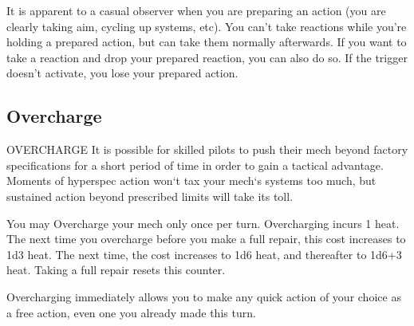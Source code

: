 It is apparent to a casual observer when you are preparing an action (you are clearly taking aim,  
cycling up systems, etc). You can’t take reactions while you’re holding a prepared action, but can  
take them normally afterwards. If you want to take a reaction and drop your prepared reaction,  
you can also do so. If the trigger doesn’t activate, you lose your prepared action.
 
\subsection{Overcharge}
                                            OVERCHARGE  
It is possible for skilled pilots to push their mech beyond factory specifications for a short period  
of time in order to gain a tactical advantage. Moments of hyperspec action won‘t tax your  
mech‘s systems too much, but sustained action beyond prescribed limits will take its toll. 
 

                                                                                                              


You may Overcharge your mech only once per turn. Overcharging incurs 1 heat. The next time  
you overcharge before you make a full repair, this cost increases to 1d3 heat. The next time, the  
cost increases to 1d6 heat, and thereafter to 1d6+3 heat. Taking a full repair resets this counter.
 

Overcharging immediately allows you to make any quick action of your choice as a free  
action, even one you already made this turn.